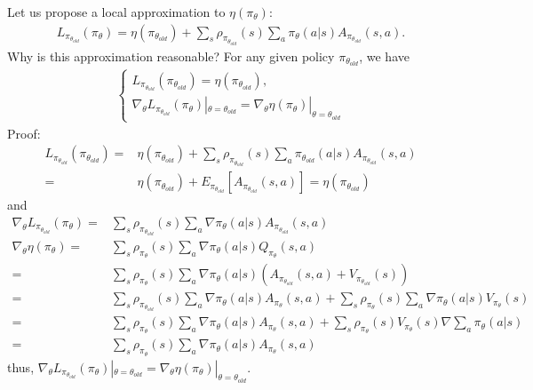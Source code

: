 Let us propose a local approximation to $\eta(\pi_{\theta})$:
\begin{align}
L_{\pi_{\theta_{old}}}(\pi_{\theta})=\eta(\pi_{\theta_{old}})+\sum_{s}\rho_{\pi_{\theta_{old}}}(s)\sum_{a}\pi_{\theta}(a|s)A_{\pi_{\theta_{old}}}(s,a).
\end{align}
Why is this approximation reasonable?  For any given policy $\pi_{\theta_{old}}$, we have
\begin{align*}\begin{cases}
L_{\pi_{\theta_{old}}}(\pi_{\theta_{old}})=\eta(\pi_{\theta_{old}}),\\
\nabla_{\theta}L_{\pi_{\theta_{old}}}(\pi_{\theta})|_{\theta=\theta_{old}}=\nabla_{\theta}\eta(\pi_{\theta})|_{\theta=\theta_{old}}\end{cases}
\end{align*}
Proof:
\begin{align*}
L_{\pi_{\theta_{old}}}(\pi_{\theta_{old}})=&\eta(\pi_{\theta_{old}})+\sum_{s}\rho_{\pi_{\theta_{old}}}(s)\sum_{a}\pi_{\theta_{old}}(a|s)A_{\pi_{\theta_{old}}}(s,a)\\
=&\eta(\pi_{\theta_{old}})+E_{\pi_{\theta_{old}}}[A_{\pi_{\theta_{old}}}(s,a)]=\eta(\pi_{\theta_{old}})
\end{align*}
and 
\begin{align*}
\nabla_{\theta}L_{\pi_{\theta_{old}}}(\pi_{\theta})=&\sum_{s}\rho_{\pi_{\theta_{old}}}(s)\sum_{a}\nabla\pi_{\theta}(a|s)A_{\pi_{\theta_{old}}}(s,a)\\
\nabla_{\theta}\eta(\pi_{\theta})=&\sum_{s}\rho_{\pi_{\theta}}(s)\sum_{a}\nabla\pi_{\theta}(a|s)Q_{\pi_{\theta}}(s,a)\\
=&\sum_{s}\rho_{\pi_{\theta}}(s)\sum_{a}\nabla\pi_{\theta}(a|s)(A_{\pi_{\theta_{old}}}(s,a)+V_{\pi_{\theta_{old}}}(s))\\
=&\sum_{s}\rho_{\pi_{\theta_{old}}}(s)\sum_{a}\nabla\pi_{\theta}(a|s)A_{\pi_{\theta}}(s,a)+\sum_{s}\rho_{\pi_{\theta}}(s)\sum_{a}\nabla\pi_{\theta}(a|s)V_{\pi_{\theta}}(s)\\
=&\sum_{s}\rho_{\pi_{\theta}}(s)\sum_{a}\nabla\pi_{\theta}(a|s)A_{\pi_{\theta}}(s,a)+\sum_{s}\rho_{\pi_{\theta}}(s)V_{\pi_{\theta}}(s)\nabla\sum_{a}\pi_{\theta}(a|s)\\
=&\sum_{s}\rho_{\pi_{\theta}}(s)\sum_{a}\nabla\pi_{\theta}(a|s)A_{\pi_{\theta}}(s,a)
\end{align*}
thus, $\nabla_{\theta}L_{\pi_{\theta_{old}}}(\pi_{\theta})|_{\theta=\theta_{old}}=\nabla_{\theta}\eta(\pi_{\theta})|_{\theta=\theta_{old}}.$

